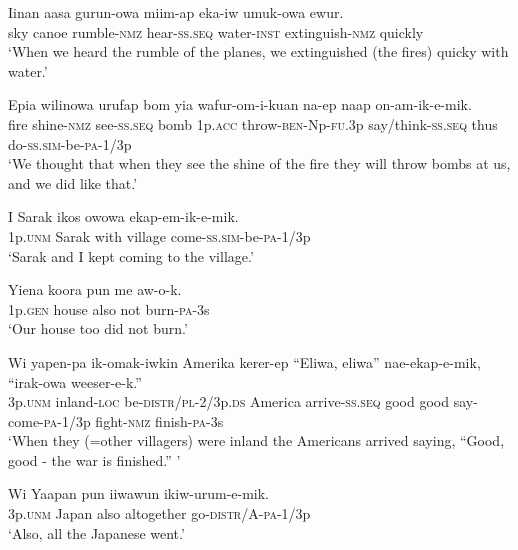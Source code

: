 \ea
\gll  Iinan  aasa  gurun-owa  miim-ap  eka-iw   umuk-owa  ewur. \\
sky  canoe  rumble-\textsc{nmz}  hear-\textsc{ss.seq}  water-\textsc{inst} extinguish-\textsc{nmz}  quickly \\


\glt ‘When we heard the rumble of the planes, we extinguished (the fires) quicky with water.’ \\
\z


\ea
\gll  Epia  wilinowa  urufap  bom  yia  wafur-om-i-kuan        na-ep  naap  on-am-ik-e-mik. \\
fire  shine-\textsc{nmz}  see-\textsc{ss.seq}  bomb  1p.\textsc{acc}  throw-\textsc{ben}-Np-\textsc{fu}.3p  say/think-\textsc{ss.seq}  thus  do{}-\textsc{ss}.\textsc{sim}-be-\textsc{pa}-1/3p \\
\glt ‘We thought that when they see the shine of the fire they will throw bombs at us, and we did like that.’ \\
\z


\ea
\gll  I  Sarak  ikos  owowa  ekap-em-ik-e-mik. \\
1p.\textsc{unm}  Sarak  with  village  come-\textsc{ss}.\textsc{sim}-be-\textsc{pa}-1/3p \\
\glt ‘Sarak and I kept coming to the village.’ \\
\z


\ea
\gll  Yiena  koora  pun  me  aw-o-k. \\
1p.\textsc{gen}  house  also  not  burn-\textsc{pa}-3s \\
\glt ‘Our house too did not burn.’ \\
\z


\ea
\gll  Wi  yapen-pa  ik-omak-iwkin  Amerika  kerer-ep             “Eliwa,  eliwa”  nae-ekap-e-mik,  “irak-owa  weeser-e-k.” \\
3p.\textsc{unm}  inland-\textsc{loc}  be-\textsc{distr}/\textsc{pl}-2/3p.\textsc{ds}  America  arrive-\textsc{ss.seq}  good  good  say-come-\textsc{pa}-1/3p  fight-\textsc{nmz}  finish-\textsc{pa}-3s \\
\glt ‘When they (=other villagers) were inland the Americans arrived saying, “Good, good - the war is finished.” ’ \\
\z


\ea
\gll  Wi  Yaapan  pun  iiwawun  ikiw-urum-e-mik. \\
3p.\textsc{unm}  Japan  also  altogether  go-\textsc{distr}/A-\textsc{pa}-1/3p \\
\glt ‘Also, all the Japanese went.’ \\
\z


